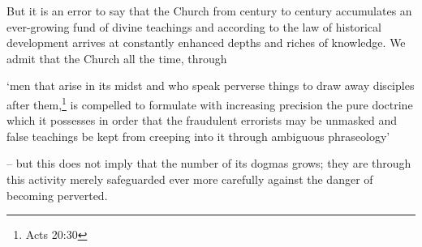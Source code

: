 \begin{fancyquotes}
                \par But it is an error to say that the Church from century to century accumulates an ever-growing fund of divine teachings and according to the law of historical development arrives at constantly enhanced depths and riches of knowledge.  We admit that the Church all the time, through \begin{displayquote}{\footnotesize `men that arise in its midst and who speak perverse things to draw away disciples after them,\footnote{Acts 20:30} is compelled to formulate with increasing precision the pure doctrine which it possesses in order that the fraudulent errorists may be unmasked and false teachings be kept from creeping into it through ambiguous phraseology'}\end{displayquote} -- but this does not imply that the number of its dogmas grows; they are through this activity merely safeguarded ever more carefully against the danger of becoming perverted. 

\end{fancyquotes}

